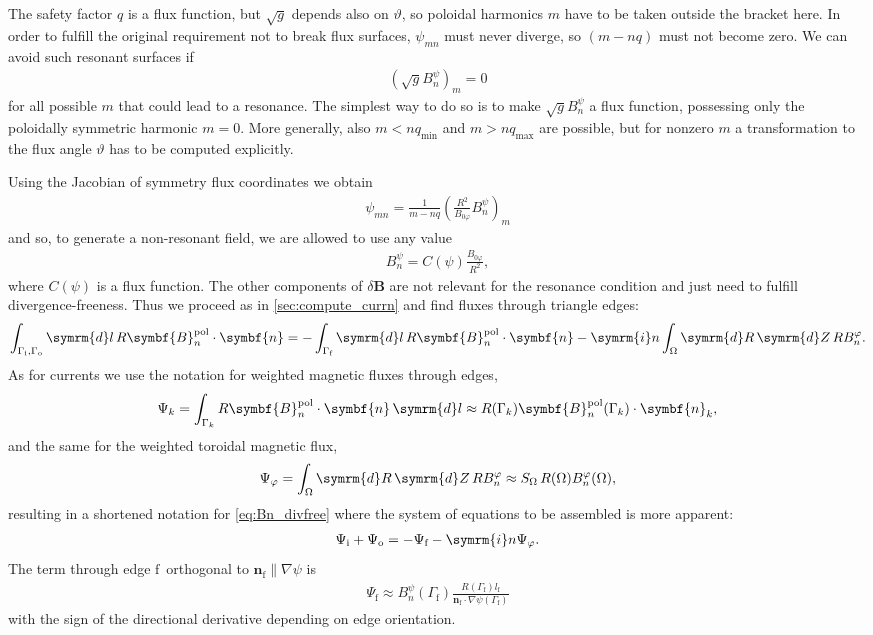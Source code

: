 \documentclass[a4paper, twoside, 10pt, english]{article}
\numberwithin{equation}{section}
\let\temp\varrho
\let\varrho\rho
\let\rho\temp
\let\temp\vartheta
\let\vartheta\theta
\let\theta\temp
\let\temp\varphi
\let\varphi\phi
\let\phi\temp
\let\vec\symbf
\newcommand*\grad{\ensuremath{\nabla}}
\newcommand*\diff{\ensuremath{\symrm{d}}}  %
\newcommand*\im{\ensuremath{\symrm{i}}}  %
\newcommand*\pol{\ensuremath{\textrm{pol}}}  %
\newcommand*\Bpert{\ensuremath{\delta \vec{B}}}  %
\newcommand*\fs{\ensuremath{\textrm{f}}}  %
\newcommand*\inw{\ensuremath{\textrm{i}}}  %
\newcommand*\out{\ensuremath{\textrm{o}}}  %
\begin{document}
The safety factor $q$ is a flux function, but $\sqrt{g}$ depends also on $\theta$, so poloidal harmonics $m$ have to be taken outside the bracket here. In order to fulfill the original requirement not to break flux surfaces, $\psi_{m n}$ must never diverge, so $(m - n q)$ must not become zero. We can avoid such resonant surfaces if
\begin{gather*}
  \left( \sqrt{g} B_{n}^{\psi} \right)_{m} = 0
\end{gather*}
for all possible $m$ that could lead to a resonance. The simplest way to do so is to make $\sqrt{g} B_{n}^{\psi}$ a flux function, possessing only the poloidally symmetric harmonic $m = 0$. More generally, also $m < n q_{\text{min}}$ and $m > n q_{\text{max}}$ are possible, but for nonzero $m$ a transformation to the flux angle $\theta$ has to be computed explicitly.

Using the Jacobian of symmetry flux coordinates we obtain
\begin{gather*}
  \psi_{m n} = \frac{1}{m - n q} \left( \frac{R^{2}}{B_{0 \phi}} B_{n}^{\psi} \right)_{m}
\end{gather*}
and so, to generate a non-resonant field, we are allowed to use any value
\begin{gather*}
  B_{n}^{\psi} = C(\psi) \frac{B_{0 \phi}}{R^{2}},
\end{gather*}
where $C(\psi)$ is a flux function. The other components of $\Bpert$ are not relevant for the resonance condition and just need to fulfill divergence-freeness. Thus we proceed as in \cref{sec:compute_currn} and find fluxes through triangle edges:
\begin{gather}
  \int_{\Gamma_{\inw}, \Gamma_{\out}} \diff l \, R \vec{B}_{n}^{\pol} \cdot \vec{n} = -\int_{\Gamma_{\fs}} \diff l \, R \vec{B}_{n}^{\pol} \cdot \vec{n} - \im n \int_{\Omega} \diff R \, \diff Z \, R B_{n}^{\phi}. \label{eq:Bn_divfree}
\end{gather}
As for currents we use the notation for weighted magnetic fluxes through edges,
\begin{gather}
  \Psi_{k} = \int_{\Gamma_{k}} R \vec{B}_{n}^{\pol} \cdot \vec{n} \, \diff l \approx R (\Gamma_{k}) \vec{B}_{n}^{\pol} (\Gamma_{k}) \cdot \vec{n}_{k},
\end{gather}
and the same for the weighted toroidal magnetic flux,
\begin{gather}
  \Psi_{\phi} = \int_{\Omega} \diff R \, \diff Z \, R B_{n}^{\phi} \approx S_{\Omega} \, R (\Omega) B_{n}^{\phi} (\Omega),
\end{gather}
resulting in a shortened notation for \cref{eq:Bn_divfree} where the system of equations to be assembled is more apparent:
\begin{gather}
  \Psi_{\inw} + \Psi_{\out} = -\Psi_{\fs} - \im n \Psi_{\phi}.
\end{gather}
The term through edge \fs\ orthogonal to $\vec{n}_{\fs} \parallel \grad \psi$ is
\begin{gather}
  \Psi_{\fs} \approx B_{n}^{\psi} (\Gamma_{\fs}) \frac{R (\Gamma_{\fs}) l_{\fs}}{\vec{n}_{\fs} \cdot \grad \psi (\Gamma_{\fs})} \label{eq:Psi_f}
\end{gather}
with the sign of the directional derivative depending on edge orientation.
\end{document}
